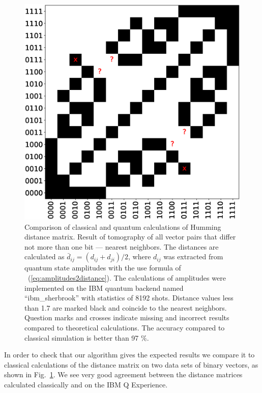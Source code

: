 \documentclass[pra,showkeys,twocolumn,showpacs,aps,10pt]{revtex4-1}
\begin{document}
\begin{figure}[t]
  \includegraphics[width=\columnwidth]{distance_matrix.eps}
  \caption{%
    Comparison of classical and quantum calculations of Humming distance matrix. Result of tomography of all vector pairs that differ not more than one bit --- nearest neighbors.  The distances are calculated as $\bar d_{ij} = (d_{ij} + d_{ji}) / 2$,
    where $d_{ij}$ was extracted from quantum state amplitudes with the use formula of ~(\ref{eq:amplitudes2distance}).
    The calculations of amplitudes were implemented on the IBM quantum backend named ``ibm\_sherbrook'' with statistics of 8192 shots. Distance values less than 1.7 are marked black and coincide to the nearest neighbors.
    Question marks and crosses indicate missing and incorrect results compared to theoretical calculations.
    The accuracy compared to classical simulation is better than 97 $\%$.
  }
  \label{fig:distance_matrix}
\end{figure}



In order to check that our algorithm gives the expected results we compare it to classical calculations of the distance matrix on two data sets of binary vectors, as shown in Fig.~\ref{fig:distance_matrix}.
We see very good agreement between the distance matrices calculated classically and on the IBM Q Experience.
\end{document}
